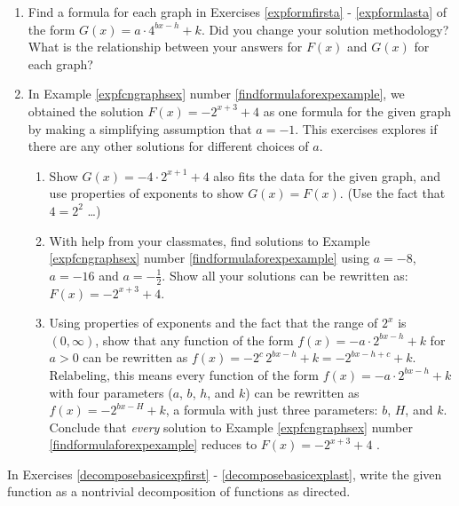 \begin{enumerate}
\setcounter{enumi}{\value{HW}}


\item 

Find a formula for each graph in Exercises \ref{expformfirsta} - \ref{expformlasta} of the form $G(x) = a \cdot 4^{bx-h} + k$.
  Did you change your solution methodology?    What is the relationship between your answers for $F(x)$ and $G(x)$ for each graph?

\item \label{morethanoneforexpexercise} In Example \ref{expfcngraphsex} number \ref{findformulaforexpexample}, we obtained the solution  $F(x) = -2^{x+3} + 4$ as one formula for the given graph by making a simplifying assumption that $a = -1$.  This exercises explores if there are any other solutions for different choices of $a$.

\begin{enumerate}

\item  Show  $G(x) = -4 \cdot 2^{x+1} + 4$ also fits the data for the given graph, and use  properties of exponents to show $G(x) = F(x)$.  (Use the fact that $4 = 2^2$ \ldots)

\item With help from your classmates, find solutions to  Example \ref{expfcngraphsex} number \ref{findformulaforexpexample} using $a = -8$, $a = -16$ and  $a = -\frac{1}{2}$.  Show all your solutions can be rewritten as: $F(x) = -2^{x+3} + 4$.

\item  Using properties of exponents and the fact that the range of $2^{x}$ is $(0, \infty)$, show that any function of the form $f(x) = -a \cdot 2^{bx-h} + k$ for $a> 0$ can be rewritten as $f(x) = - 2^{c} \, 2^{bx-h} + k = -2^{bx-h+c} + k$.  Relabeling, this means every function of the form $f(x) = -a \cdot 2^{bx-h} + k$ with four parameters ($a$, $b$, $h$, and $k$) can be rewritten as $f(x) =  - 2^{bx - H} + k$, a formula with just three parameters:  $b$, $H$, and $k$.  Conclude that  \textit{every} solution to Example \ref{expfcngraphsex} number \ref{findformulaforexpexample} reduces to $F(x) = -2^{x+3} + 4$ .

\end{enumerate}
\setcounter{HW}{\value{enumi}}
\end{enumerate}

In Exercises \ref{decomposebasicexpfirst} - \ref{decomposebasicexplast}, write the given function as a nontrivial decomposition of functions as directed.

